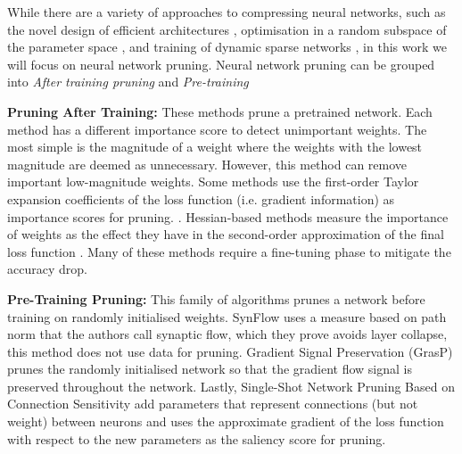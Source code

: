 While there are a variety of approaches to compressing neural networks, such
as the novel design of efficient architectures
\cite{tanEfficientNetRethinkingModel2019,
howardMobileNetsEfficientConvolutional2017,
sandlerMobileNetV2InvertedResiduals2019}, optimisation in a random subspace of
the
parameter space \cite{liMeasuringIntrinsicDimension2022}, and training of dynamic sparse networks 
\cite{mocanuScalableTrainingArtificial2018a,bellecDeepRewiringTraining2018,
evciRiggingLotteryMaking2020,dettmersSparseNetworksScratch2019} , in this work we will focus on neural network pruning.
Neural network pruning can be grouped into \textit{After training pruning}
and \textit{Pre-training } 

\textbf{Pruning After Training:} These methods prune a pretrained network.
Each method has a different importance score to detect unimportant weights.
The most simple is the magnitude of a weight
\cite{hanLearningBothWeights2015a,hanDeepCompressionCompressing2016a} where the
weights with the lowest magnitude are deemed as
 unnecessary. However, this method can remove important low-magnitude weights.
 Some methods use the first-order Taylor expansion coefficients of the loss function (i.e. gradient information)  as importance scores for pruning. \cite{karninsimpleprocedurepruning1990a,mozerSkeletonizationTechniqueTrimming1988}.
 Hessian-based methods measure the importance of weights as the effect they
 have in the second-order approximation of the final loss function 
 \cite{hassibiSecondOrderDerivatives1992,lecunOptimalBrainDamage1989,
 hassibiOptimalBrainSurgeon1993,singhWoodFisherEfficientSecondOrder2020}.
 Many of these methods require a fine-tuning phase to mitigate the accuracy
 drop.




\textbf{Pre-Training Pruning:} This family of algorithms prunes a
network before training on randomly initialised weights. SynFlow
\cite{tanakaPruningNeuralNetworks2020a} uses a measure based on path norm
\cite{neyshaburPathSGDPathNormalizedOptimization2015} that the authors call
synaptic flow, which they prove avoids layer collapse, this method does not use
data for pruning. Gradient Signal Preservation
(GrasP) \cite{wangPickingWinningTickets2020} prunes the randomly initialised network so that the
gradient flow signal is preserved throughout the network.
Lastly, Single-Shot Network Pruning Based on Connection Sensitivity
\cite{leeSNIPSINGLESHOTNETWORK2018} add parameters that represent
connections (but not weight) between neurons and uses the approximate
gradient of the loss function with respect to the new parameters as the
saliency score for pruning. 

